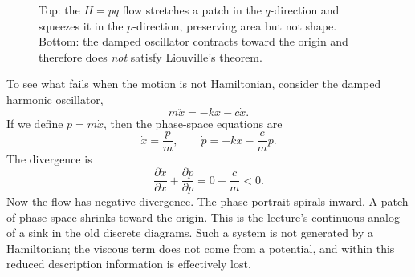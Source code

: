 \begin{figure}[h]
\centering
{}
\hspace{1.0cm}

\vspace{0.8cm}

\caption{Top: the \(H=pq\) flow stretches a patch in the \(q\)-direction and squeezes it in the \(p\)-direction, preserving area but not shape. Bottom: the damped oscillator contracts toward the origin and therefore does \emph{not} satisfy Liouville's theorem.}
\end{figure}

To see what fails when the motion is not Hamiltonian, consider the damped harmonic oscillator,
\begin{equation}
m\ddot x=-kx-c\dot x.
\end{equation}
If we define \(p=m\dot x\), then the phase-space equations are
\begin{equation}
\dot x=\frac{p}{m}, \qquad \dot p=-kx-\frac{c}{m}p.
\end{equation}
The divergence is
\begin{equation}
\frac{\partial \dot x}{\partial x}+\frac{\partial \dot p}{\partial p}
=
0-\frac{c}{m}<0.
\end{equation}
Now the flow has negative divergence. The phase portrait spirals inward. A patch of phase space shrinks toward the origin. This is the lecture's continuous analog of a sink in the old discrete diagrams. Such a system is not generated by a Hamiltonian; the viscous term does not come from a potential, and within this reduced description information is effectively lost.

